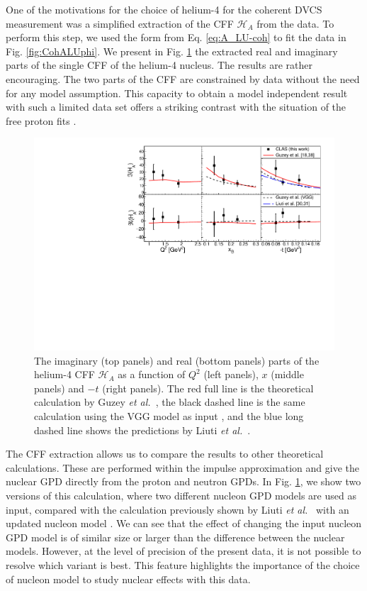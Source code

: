 \documentclass[aps,prc,preprint,superscriptaddress]{revtex4}
\begin{document}
One of the motivations for the choice of helium-4 for the coherent DVCS measurement was
a simplified extraction of the CFF $\mathcal{H}_A$ from the
data. To perform this step, we used the form from Eq. \ref{eq:A_LU-coh} to fit the data in Fig. 
\ref{fig:CohALUphi}. We present in Fig. \ref{fig:CohCFF} the extracted real and imaginary parts 
of the single CFF of the helium-4 nucleus. The results are rather encouraging. The two parts
of the CFF are constrained by data without the need for any model assumption. This capacity to obtain a
model independent result with such a limited data set offers a striking contrast with the
situation of the free proton fits \cite{Dupre:2016mai,Dupre:2017hfs}.

\begin{figure}[tbp!]
\center
\includegraphics[width=14cm]{Coherent_CFF.pdf}
	\caption{The imaginary (top panels) and real (bottom panels) parts of the helium-4
	CFF $\mathcal{H}_A$ as a function of $Q^2$ (left panels), $x$ (middle panels) and 
	$-t$ (right panels). The red full line is the theoretical calculation by 
	Guzey {\it et al.}~\cite{Guzey:2003jh,Guzey:2008th}, the black dashed line is the same calculation 
	using the VGG model as input \cite{Vanderhaeghen:1999xj,Guidal:2004nd}, and
	the blue long dashed line shows the predictions by Liuti {\it et 
	al.}~\cite{Liuti:2005gi,GonzalezHernandez:2012jv}.} 
\label{fig:CohCFF}
\end{figure}

The CFF extraction allows us to compare the results to other theoretical calculations.
These are performed within the impulse approximation \cite{Guzey:2003jh,Guzey:2008th} 
and give the nuclear GPD directly from the proton and neutron GPDs. In 
Fig. \ref{fig:CohCFF}, we show two versions of this calculation, where two different nucleon GPD
models are used as input, compared with the calculation previously shown by Liuti 
{\it et al.}~\cite{Liuti:2005gi} with an updated nucleon model \cite{GonzalezHernandez:2012jv}.
We can see that the effect of changing the input nucleon GPD model
is of similar size or larger than the difference between the nuclear 
models. However, at the level of precision of the present data,
it is not possible to resolve which variant is best. This feature highlights the 
importance of the choice of nucleon model to study nuclear effects with this data.
\end{document}
